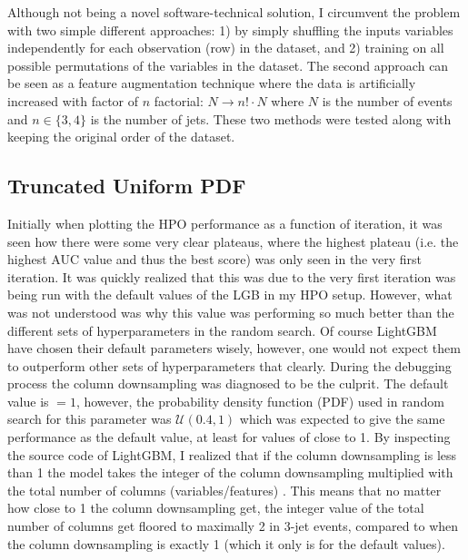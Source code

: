 Although not being a novel software-technical solution, I circumvent the problem with two simple different approaches: 1) by simply shuffling the inputs variables independently for each observation (row) in the dataset, and 2) training on all possible permutations of the variables in the dataset. The second approach can be seen as a feature augmentation technique where the data is artificially increased with factor of $n$ factorial: $N \rightarrow n!\cdot N$ where $N$ is the number of events and $n\in \{3, 4\}$ is the number of jets. These two methods were tested along with keeping the original order of the dataset. 

\subsection{Truncated Uniform PDF}
\label{subsec:q:trunc_uniform}

Initially when plotting the HPO performance as a function of iteration, it was seen how there were some very clear plateaus, where the highest plateau (i.e. the highest AUC value and thus the best score) was only seen in the very first iteration. It was quickly realized that this was due to the very first iteration was being run with the default values of the LGB in my HPO setup. However, what was not understood was why this value was performing so much better than the different sets of hyperparameters in the random search. Of course LightGBM have chosen their default parameters wisely, however, one would not expect them to outperform other sets of hyperparameters that clearly. During the debugging process the column downsampling  was diagnosed to be the culprit. The default value is $=1$, however, the probability density function (PDF) used in random search for this parameter was $\mathcal{U}(0.4, 1)$ which was expected to give the same performance as the default value, at least for values of  close to \num{1}. By inspecting the source code of LightGBM, I realized that if the column downsampling is less than \num{1} the model takes the integer of the column downsampling multiplied with the total number of columns (variables/features) \autocite{MicrosoftLightGBM}. This means that no matter how close to \num{1} the column downsampling get, the integer value of the total number of columns get floored to {maximally} \num{2} in 3-jet events, compared to when the column downsampling is exactly \num{1} (which it only is for the default values).

